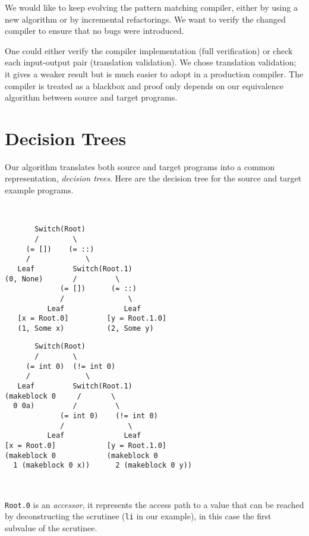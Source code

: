 \documentclass[12pt]{article}
\begin{document}
We would like to keep evolving the pattern matching compiler, either by
using a new algorithm or by incremental refactorings.
We want to verify the changed compiler to ensure that no bugs were
introduced.

One could either verify the compiler implementation
(full verification) or check each input-output pair
(translation validation). We chose translation validation; it gives
a weaker result but is much easier to adopt in a production
compiler. The compiler is treated as a blackbox and proof only depends
on our equivalence algorithm between source and target programs.

\section{Decision Trees}

Our algorithm translates both source and target
programs into a common representation, \emph{decision trees}.
Here are the decision tree for the source and target example programs.

~

\hspace{-2em}
\begin{minipage}{0.5\linewidth}
\begin{verbatim}
       Switch(Root)
       /        \
     (= [])    (= ::)
     /             \
   Leaf         Switch(Root.1)
(0, None)       /         \
             (= [])      (= ::)
             /               \
          Leaf              Leaf
   [x = Root.0]         [y = Root.1.0]
   (1, Some x)          (2, Some y)
\end{verbatim}
\end{minipage}
\hfill
\begin{minipage}{0.5\linewidth}
\begin{verbatim}
       Switch(Root)
       /        \
     (= int 0)  (!= int 0)
     /             \
   Leaf         Switch(Root.1)
(makeblock 0     /       \
  0 0a)         /         \
             (= int 0)    (!= int 0)
             /               \
          Leaf              Leaf
[x = Root.0]            [y = Root.1.0]
(makeblock 0            (makeblock 0
  1 (makeblock 0 x))      2 (makeblock 0 y))
\end{verbatim}
\end{minipage}

~

\texttt{Root.0} is an \emph{accessor}, it represents the
access path to a value that can be reached by deconstructing the
scrutinee (\texttt{li} in our example), in this case the first
subvalue of the scrutinee.
\end{document}
